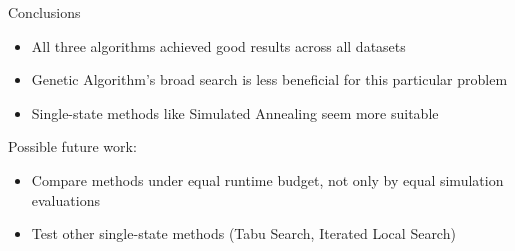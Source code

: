 \documentclass[portrait,a0paper,fontscale=0.28]{baposter}
\begin{document}
\begin{poster}
\begin{posterbox}[column=1, name=conclusion, below=result3,
]{Conclusions}
\begin{itemize}
\item All three algorithms achieved good results across all datasets
\item Genetic Algorithm's broad search is less beneficial for this particular problem
\item Single-state methods like Simulated Annealing seem more suitable
\end{itemize}
\vspace{-1ex}
Possible future work:
\begin{itemize}
\item Compare methods under equal runtime budget, not only by equal simulation evaluations
\item Test other single-state methods (Tabu Search, Iterated Local Search)
\end{itemize}
\end{posterbox}

\end{poster}
\end{document}
